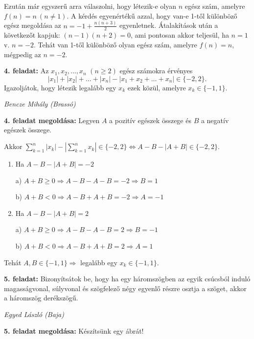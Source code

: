 \documentclass[a4paper,10pt]{article}
\def\ki#1#2{\hfill {\it #1 (#2)}\medskip}
\begin{document}
Ezután már egyszerű arra válaszolni, hogy létezik-e olyan $n$ egész
szám, amelyre $f(n) = n\  (n\ne 1)$. A kérdés egyenértékű azzal, hogy van-e 1-től különböző egész
megoldása az $n = -1 + \frac{n(n + 3)}{2}$ egyenletnek. Átalakítások után a
következőt kapjuk: $(n - 1)(n + 2) = 0$,
ami pontosan akkor teljesül, ha
$n = 1$ v. $n = -2$. Tehát van 1-től különböző olyan egész szám, amelyre
$f(n) = n$, mégpedig az $n = -2$.


\medskip
{\bf 4. feladat: } Az $x_1, x_2,\dots, x_n$  $(n\ge 2)$ egész számokra érvényes 
     $$|x_1|+|x_2|+\dots+|x_n| - |x_1+ x_2+\dots+ x_n|\in
     \{-2, 2\}. $$
Igazoljátok, hogy létezik legalább egy $x_k$ ezek közül, amelyre $x_k\in \{-1, 1\}$.  

\ki{Bencze Mihály}{Brassó}\medskip

{\bf 4. feladat megoldása: } Legyen $A$ a pozitív egészek összege és
$B$ a negatív egészek összege.

Akkor $\displaystyle{\sum_{k=1}^n |x_k|-\left|\sum_{k=1}^n x_k\right|\in\{-2,2\}
\Leftrightarrow A-B-\left|A+B\right|\in\{-2,2\}}$.

\begin{enumerate}

\item  Ha $A-B-\left|A+B\right|=-2$

a) $A+B\ge 0\Rightarrow A-B-A-B=-2 \Rightarrow B=1$

b) $A+B< 0\Rightarrow A-B+A+B=-2 \Rightarrow A=-1$

\item  Ha $A-B-\left|A+B\right|=2$

a) $A+B\ge 0\Rightarrow A-B-A-B=2 \Rightarrow B=-1$

b) $A+B< 0\Rightarrow A-B+A+B=2 \Rightarrow A=1$ 
\end{enumerate}

Tehát $A, B \in \{-1,1\}\Rightarrow$ legalább egy $x_k\in\{-1,1\}$.


\medskip
{\bf 5. feladat: } Bizonyítsátok be, hogy ha egy háromszögben az egyik csúcsból induló magasságvonal, súlyvonal és szögfelező négy egyenlő részre osztja a szöget, akkor a háromszög derékszögű. 

\ki{Egyed László}{Baja}\medskip

{\bf 5. feladat megoldása: } Készítsünk egy ábrát!
\end{document}
